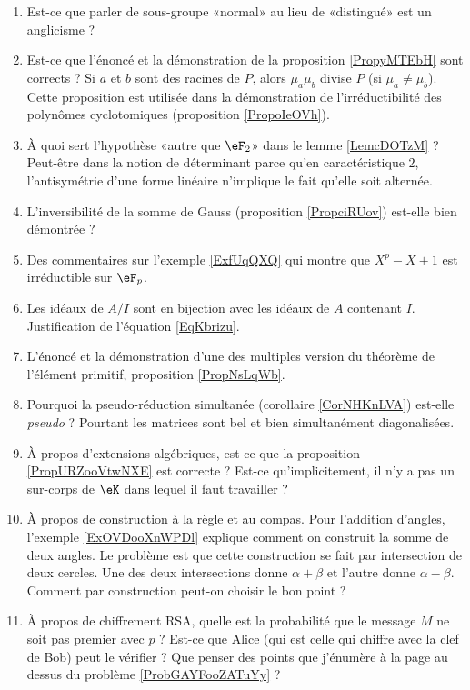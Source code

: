 \begin{enumerate}
    \item
        Est-ce que parler de sous-groupe «normal» au lieu de «distingué» est un anglicisme ?
    \item
        Est-ce que l'énoncé et la démonstration de la proposition \ref{PropyMTEbH} sont corrects ? Si \( a\) et \( b\) sont des racines de \( P\), alors \( \mu_a\mu_b\) divise \( P\) (si \( \mu_a\neq \mu_b\)). Cette proposition est utilisée dans la démonstration de l'irréductibilité des polynômes cyclotomiques (proposition \ref{PropoIeOVh}).
    \item
        À quoi sert l'hypothèse «autre que \( \eF_2\)» dans le lemme \ref{LemcDOTzM} ? Peut-être dans la notion de déterminant parce qu'en caractéristique \( 2\), l'antisymétrie d'une forme linéaire n'implique le fait qu'elle soit alternée.
    \item
        L'inversibilité de la somme de Gauss (proposition \ref{PropciRUov}) est-elle bien démontrée ?
    \item
        Des commentaires sur l'exemple \ref{ExfUqQXQ} qui montre que \( X^p-X+1\) est irréductible sur \( \eF_p\).
    \item
        Les idéaux de \( A/I\) sont en bijection avec les idéaux de \( A\) contenant \( I\). Justification de l'équation \eqref{EqKbrizu}.
    \item
        L'énoncé et la démonstration d'une des multiples version du théorème de l'élément primitif, proposition \ref{PropNsLqWb}.
    \item
        Pourquoi la pseudo-réduction simultanée (corollaire \ref{CorNHKnLVA}) est-elle \emph{pseudo} ? Pourtant les matrices sont bel et bien simultanément diagonalisées.
    \item
        À propos d'extensions algébriques, est-ce que la proposition \ref{PropURZooVtwNXE} est correcte ? Est-ce qu'implicitement, il n'y a pas un sur-corps de \( \eK\) dans lequel il faut travailler ?
    \item
        À propos de construction à la règle et au compas. Pour l'addition d'angles, l'exemple \ref{ExOVDooXnWPDl} explique comment on construit la somme de deux angles. Le problème est que cette construction se fait par intersection de deux cercles. Une des deux intersections donne \( \alpha+\beta\) et l'autre donne \( \alpha-\beta\). Comment par construction peut-on choisir le bon point ?
    \item
        À propos de chiffrement RSA, quelle est la probabilité que le message \( M\) ne soit pas premier avec \( p\) ? Est-ce que Alice (qui est celle qui chiffre avec la clef de Bob) peut le vérifier ? Que penser des points que j'énumère à la page \pageref{PageAKTBooMDeQxY} au dessus du problème \ref{ProbGAYFooZATuYy} ?

\end{enumerate}
